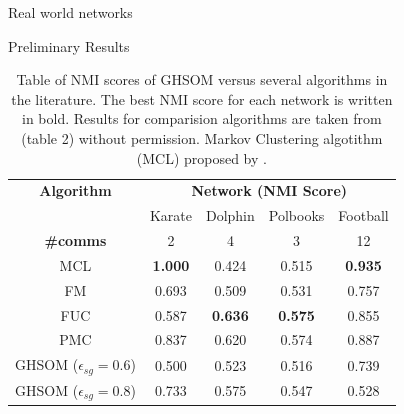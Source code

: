 \documentclass{beamer}
\begin{document}
\begin{frame}[allowframebreaks]{Real world networks}
	\end{frame}
	
	\begin{frame}{Preliminary Results}
	\begin{table}
\centering
\begin{tabular}{ c c c c c }
\toprule
\textbf{Algorithm} & \multicolumn{4}{c}{\textbf{Network (NMI Score)}}\\
{} & Karate & Dolphin & Polbooks & Football \\ 
\bottomrule
\textbf{\#comms} & 2 & 4 & 3 & 12 \\
\bottomrule 
MCL & \textbf{1.000} & 0.424 & 0.515 & \textbf{0.935} \\ 
FM & 0.693 & 0.509 & 0.531 & 0.757 \\ 
FUC & 0.587 & \textbf{0.636} & \textbf{0.575} & 0.855 \\ 
PMC & 0.837 & 0.620 & 0.574 & 0.887 \\ 
\toprule
GHSOM ($\epsilon_{sg}=0.6$) & 0.500 & 0.523 & 0.516 & 0.739 \\
GHSOM ($\epsilon_{sg}=0.8$) & 0.733 & 0.575 & 0.547 & 0.528 \\
\bottomrule
\end{tabular}
\caption{Table of NMI scores of GHSOM versus several algorithms in the literature. The best NMI score for each network is written in bold. Results for comparision algorithms are taken from \protect\cite{yang2013hierarchical} (table 2) without permission. Markov Clustering algotithm (MCL) proposed by \protect\cite{van2001graph}.}
\label{real_world_experiment}
\end{table}
	
	\end{frame}
	
\end{document}
